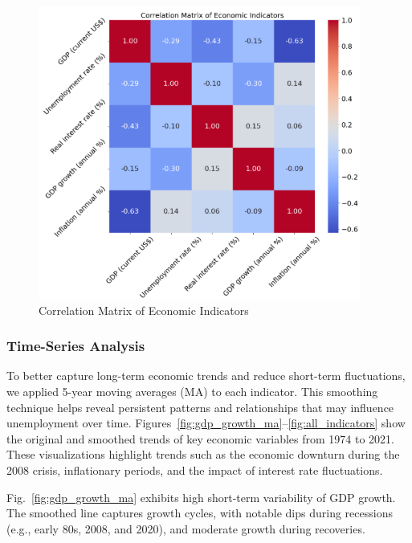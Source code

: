 \documentclass[conference]{IEEEtran}
\begin{document}
\begin{figure}[H]
    \centering
    \includegraphics[width=0.9\linewidth]{correlation_matrix.png}
    \caption{Correlation Matrix of Economic Indicators}
    \label{fig:correlation}
\end{figure}
\vspace{-10pt}


\subsubsection*{Time-Series Analysis}
To better capture long-term economic trends and reduce short-term fluctuations, we applied 5-year moving averages (MA) to each indicator. This smoothing technique helps reveal persistent patterns and relationships that may influence unemployment over time. Figures~\ref{fig:gdp_growth_ma}--\ref{fig:all_indicators} show the original and smoothed trends of key economic variables from 1974 to 2021. These visualizations highlight trends such as the economic downturn during the 2008 crisis, inflationary periods, and the impact of interest rate fluctuations.

Fig.~\ref{fig:gdp_growth_ma} exhibits high short-term variability of GDP growth. The smoothed line captures growth cycles, with notable dips during recessions (e.g., early 80s, 2008, and 2020), and moderate growth during recoveries.
\end{document}
